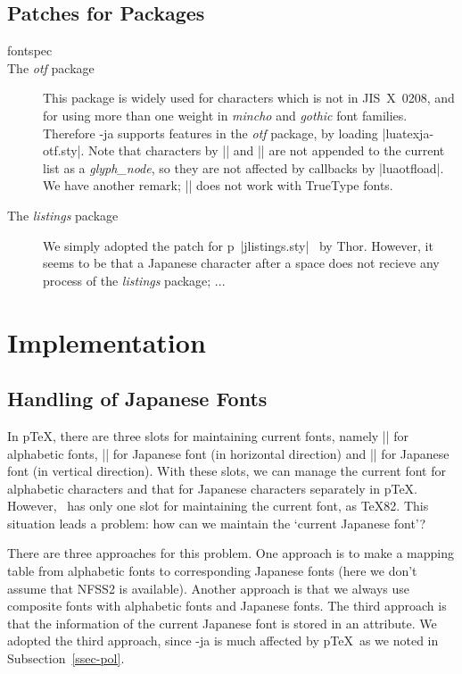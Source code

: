 \documentclass{ajt}
\begin{document}
\subsection{Patches for Packages}
\begin{description}
\item[fontspec]

\item[The \emph{otf} package]
This package is widely used for characters which is
not in JIS~X~0208, and for using more than one weight in \emph{mincho}
and \emph{gothic} font families. Therefore \LuaTeX-ja supports features
in the \emph{otf} package, by loading |luatexja-otf.sty|. Note that
characters by || and || are not appended to the
current list as a \emph{glyph\_node}, so they are not affected by
callbacks by |luaotfload|. We have another remark; |\CID| does not work
with TrueType fonts.

\item[The \emph{listings} package]
We simply adopted the patch for p\LaTeXe\ |jlistings.sty|~\cite{jlisting} by Thor. 
However, it seems to be that a Japanese character after a space does not
	   recieve any process of the \emph{listings} package; ...
\end{description}



\section{Implementation}
\subsection{Handling of Japanese Fonts}
In p\TeX, there are three slots for maintaining current fonts, namely
|\font| for alphabetic fonts, |\jfont| for Japanese font (in horizontal
direction) and |\tfont| for Japanese font (in vertical direction). With
these slots, we can manage the current font for alphabetic characters
and that for Japanese characters separately in p\TeX.  However, \LuaTeX\
has only one slot for maintaining the current font, as \TeX82.  This
situation leads a problem: how can we maintain the `current Japanese
font'?

There are three approaches for this problem. One approach is to make a
mapping table from alphabetic fonts to corresponding Japanese fonts
(here we don't assume that NFSS2 is available).  Another approach is
that we always use composite fonts with alphabetic fonts and Japanese
fonts. The third approach is that the information of the current
Japanese font is stored in an attribute. We adopted the third approach,
since \LuaTeX-ja is much affected by p\TeX\ as we noted in
Subsection~\ref{ssec-pol}.
\end{document}

